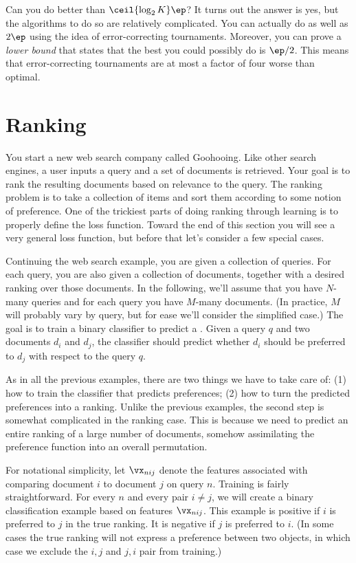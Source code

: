 Can you do better than $\ceil{\log_2 K}\ep$?  It turns out the answer
is yes, but the algorithms to do so are relatively complicated.  You
can actually do as well as $2\ep$ using the idea of error-correcting
tournaments.  Moreover, you can prove a \emph{lower bound} that states
that the best you could possibly do is $\ep/2$.  This means that
error-correcting tournaments are at most a factor of four worse than
optimal.

\section{Ranking}

You start a new web search company called Goohooing.  Like other
search engines, a user inputs a query and a set of documents is
retrieved.  Your goal is to rank the resulting documents based on
relevance to the query.  The ranking problem is to take a collection
of items and sort them according to some notion of preference.  One of
the trickiest parts of doing ranking through learning is to properly
define the loss function.  Toward the end of this section you will see
a very general loss function, but before that let's consider a few
special cases.

Continuing the web search example, you are given a collection of
queries.  For each query, you are also given a collection of
documents, together with a desired ranking over those documents.  In
the following, we'll assume that you have $N$-many queries and for
each query you have $M$-many documents.  (In practice, $M$ will
probably vary by query, but for ease we'll consider the simplified
case.)  The goal is to train a binary classifier to predict a
.  Given a query $q$ and two documents
$d_i$ and $d_j$, the classifier should predict whether $d_i$ should be
preferred to $d_j$ with respect to the query $q$.

As in all the previous examples, there are two things we have to take
care of: (1) how to train the classifier that predicts preferences;
(2) how to turn the predicted preferences into a ranking.  Unlike the
previous examples, the second step is somewhat complicated in the
ranking case.  This is because we need to predict an entire ranking of
a large number of documents, somehow assimilating the preference
function into an overall permutation.

For notational simplicity, let $\vx_{nij}$ denote the features
associated with comparing document $i$ to document $j$ on query $n$.
Training is fairly straightforward.  For every $n$ and every pair $i
\neq j$, we will create a binary classification example based on
features $\vx_{nij}$.  This example is positive if $i$ is preferred to
$j$ in the true ranking.  It is negative if $j$ is preferred to $i$.
(In some cases the true ranking will not express a preference between
two objects, in which case we exclude the $i,j$ and $j,i$ pair from
training.)

